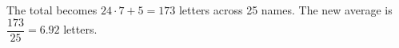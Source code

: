 The total becomes $ 24\cdot7+5=173 $ letters across 25 names. The new average is $\boxed{\dfrac{173}{25}=6.92}$ letters.
